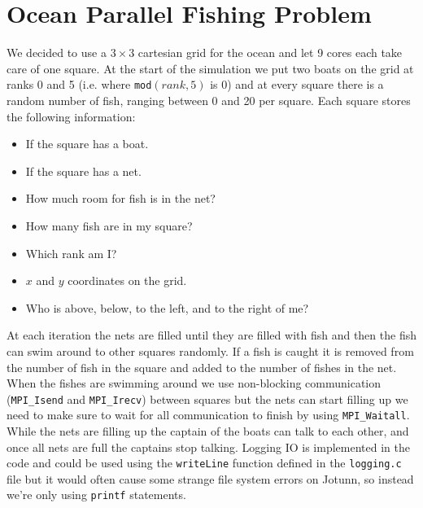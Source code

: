 \documentclass{article}
\begin{document}
\section{Ocean Parallel Fishing Problem}
We decided to use a $3 \times 3$ cartesian grid for the ocean and let 9 cores each take care of one square. At the start of the simulation we put two boats on the grid at ranks 0 and 5 (i.e. where \texttt{mod}$(rank,5)$ is 0) and at every square there is a random number of fish, ranging between 0 and 20 per square. Each square stores the following information:
\vspace{-0.4cm}\begin{itemize} \itemsep-1pt 
\item If the square has a boat.
\item If the square has a net.
\item How much room for fish is in the net?
\item How many fish are in my square?
\item Which rank am I?
\item $x$ and $y$ coordinates on the grid.
\item Who is above, below, to the left, and to the right of me? 
\end{itemize}\vspace{-0.2cm}
At each iteration the nets are filled until they are filled with fish and then the fish can swim around to other squares randomly. If a fish is caught it is removed from the number of fish in the square and added to the number of fishes in the net. When the fishes are swimming around we use non-blocking communication (\texttt{MPI\_Isend} and \texttt{MPI\_Irecv}) between squares but the nets can start filling up we need to make sure to wait for all communication to finish by using \texttt{MPI\_Waitall}. While the nets are filling up the captain of the boats can talk to each other, and once all nets are full the captains stop talking. Logging IO is implemented in the code and could be used using the \texttt{writeLine} function defined in the \texttt{logging.c} file but it would often cause some strange file system errors on Jotunn, so instead we're only using \texttt{printf} statements.
\end{document}
